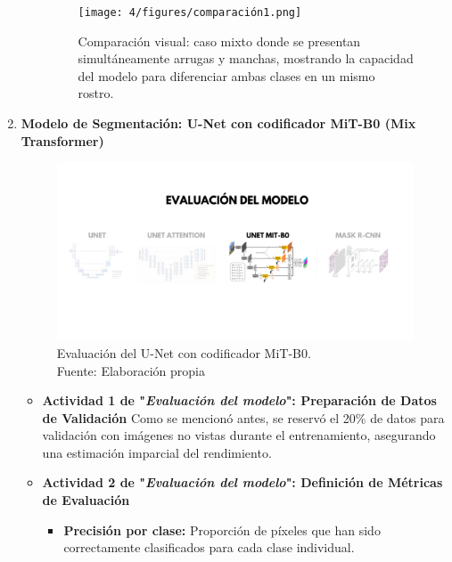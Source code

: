 \begin{enumerate}
\begin{itemize}
\begin{figure}[H]
\centering
\texttt{[image: 4/figures/comparación1.png]}
\caption{Comparación visual: caso mixto donde se presentan simultáneamente arrugas y manchas, mostrando la capacidad del modelo para diferenciar ambas clases en un mismo rostro.}
\label{fig:validacion3}
\end{figure}

  \end{itemize}

  \newpage
  \item \textbf{Modelo de Segmentación: U-Net con codificador MiT-B0 (Mix Transformer)}
  \begin{figure}[H]
	\begin{center}
		\includegraphics[width=1\textwidth]{4/figures/evunetmit.png}
		\caption[Evaluación del U-Net con codificador MiT-B0]{Evaluación del U-Net con codificador MiT-B0.\\
		Fuente: Elaboración propia}
		\label{4:figevunetmit}
	\end{center}
\end{figure}
  \begin{itemize}
  \item\textbf{Actividad 1 de "\textit{Evaluación del modelo}": Preparación de Datos de Validación}
  Como se mencionó antes, se reservó el 20\% de datos para validación con imágenes no vistas durante el entrenamiento, asegurando una estimación imparcial del rendimiento.
  
  \item\textbf{Actividad 2 de "\textit{Evaluación del modelo}": Definición de Métricas de Evaluación}
     \begin{itemize}
  \item \textbf{Precisión por clase:} Proporción de píxeles que han sido correctamente clasificados para cada clase individual.


\end{itemize}
\end{itemize}
\end{enumerate}
